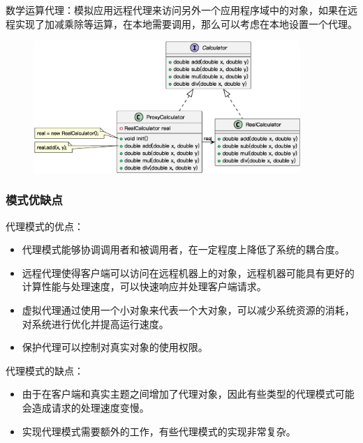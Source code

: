 数学运算代理：模拟应用远程代理来访问另外一个应用程序域中的对象，如果在远程实现了加减乘除等运算，在本地需要调用，那么可以考虑在本地设置一个代理。
\begin{figure}[H]
    \vspace{-0.5em}
	\centering
	\includegraphics[width=0.9\textwidth]{images/代理模式实例2.eps}
    \vspace{-1em}
\end{figure}

\subsubsection{模式优缺点}
代理模式的优点：
\begin{itemize}
    \item 代理模式能够协调调用者和被调用者，在一定程度上降低了系统的耦合度。
    \item 远程代理使得客户端可以访问在远程机器上的对象，远程机器可能具有更好的计算性能与处理速度，可以快速响应并处理客户端请求。
    \item 虚拟代理通过使用一个小对象来代表一个大对象，可以减少系统资源的消耗，对系统进行优化并提高运行速度。
    \item 保护代理可以控制对真实对象的使用权限。
\end{itemize}

代理模式的缺点：
\begin{itemize}
    \item 由于在客户端和真实主题之间增加了代理对象，因此有些类型的代理模式可能会造成请求的处理速度变慢。
    \item 实现代理模式需要额外的工作，有些代理模式的实现非常复杂。
\end{itemize}


